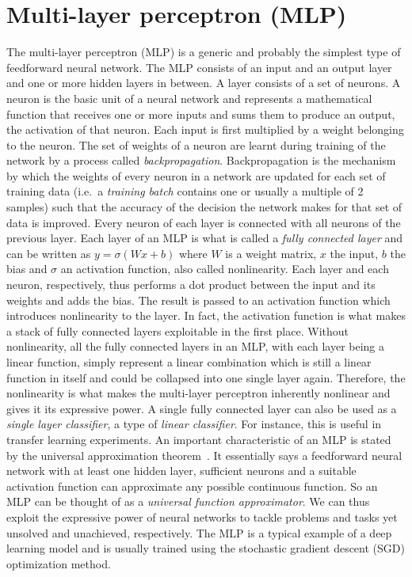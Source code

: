\documentclass[a4paper,12pt]{report}
\begin{document}
\section{Multi-layer perceptron (MLP)}\label{subsec:mlp}
The multi-layer perceptron (MLP) is a generic and probably the simplest type of feedforward neural network. The MLP consists of an input and an output layer and one or more hidden layers in between. A layer consists of a set of neurons. A neuron is the basic unit of a neural network and represents a mathematical function that receives one or more inputs and sums them to produce an output, the activation of that neuron. Each input is first multiplied by a weight belonging to the neuron. The set of weights of a neuron are learnt during training of the network by a process called \textit{backpropagation}. Backpropagation is the mechanism by which the weights of every neuron in a network are updated for each set of training data (i.e.\ a \textit{training batch} contains one or usually a multiple of 2 samples) such that the accuracy of the decision the network makes for that set of data is improved. Every neuron of each layer is connected with all neurons of the previous layer. Each layer of an MLP is what is called a \textit{fully connected layer} and can be written as $y = \sigma (Wx + b)$ where $W$ is a weight matrix, $x$ the input, $b$ the bias and $\sigma$ an activation function, also called nonlinearity. Each layer and each neuron, respectively, thus performs a dot product between the input and its weights and adds the bias. The result is passed to an activation function which introduces nonlinearity to the layer. In fact, the activation function is what makes a stack of fully connected layers exploitable in the first place. Without nonlinearity, all the fully connected layers in an MLP, with each layer being a linear function, simply represent a linear combination which is still a linear function in itself and could be collapsed into one single layer again. Therefore, the nonlinearity is what makes the multi-layer perceptron inherently nonlinear and gives it its expressive power. A single fully connected layer can also be used as a \textit{single layer classifier}, a type of \textit{linear classifier}. For instance, this is useful in transfer learning experiments. An important characteristic of an MLP is stated by the universal approximation theorem~\cite{mlpUnivApprox}. It essentially says a feedforward neural network with at least one hidden layer, sufficient neurons and a suitable activation function can approximate any possible continuous function. So an MLP can be thought of as a \textit{universal function approximator}. We can thus exploit the expressive power of neural networks to tackle problems and tasks yet unsolved and unachieved, respectively. The MLP is a typical example of a deep learning model and is usually trained using the stochastic gradient descent (SGD) optimization method.
\end{document}
